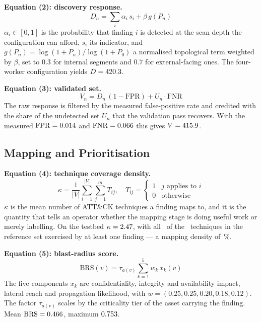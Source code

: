 \documentclass[journal]{IEEEtran}
\begin{document}
\textbf{Equation (2): discovery response.}
\begin{equation}
  D_n = \sum_{i} \alpha_i \, s_i + \beta \, g(P_n)
  \label{eq:discovery}
\end{equation}
$\alpha_i \in [0,1]$ is the probability that finding $i$ is detected at the
scan depth the configuration can afford, $s_i$ its indicator, and
$g(P_n)=\log(1+P_n)/\log(1+P_0)$ a normalised topological term weighted by
$\beta$, set to $0.3$ for internal segments and $0.7$ for external-facing
ones. The four-worker configuration yields $D=420.3$.

\textbf{Equation (3): validated set.}
\begin{equation}
  V_n = D_n\,(1-\mathrm{FPR}) + U_n \cdot \mathrm{FNR}
  \label{eq:validate}
\end{equation}
The raw response is filtered by the measured false-positive rate and credited
with the share of the undetected set $U_n$ that the validation pass recovers.
With the measured $\mathrm{FPR}=0.014$ and $\mathrm{FNR}=0.066$ this gives
$V=415.9$.

\subsection{Mapping and Prioritisation}

\textbf{Equation (4): technique coverage density.}
\begin{equation}
  \kappa = \frac{1}{|V|}\sum_{i=1}^{|V|}\sum_{j=1}^{m} T_{ij},
  \quad
  T_{ij}=\begin{cases} 1 & j \text{ applies to } i\\
                       0 & \text{otherwise}\end{cases}
  \label{eq:coverage}
\end{equation}
$\kappa$ is the mean number of ATT\&CK techniques a finding maps to, and it is
the quantity that tells an operator whether the mapping stage is doing useful
work or merely labelling. On the testbed $\kappa=2.47$, with all
\techCovered\ of the \techTotal\ techniques in the reference set exercised by
at least one finding --- a mapping density of \mapDensity\,\%.

\textbf{Equation (5): blast-radius score.}
\begin{equation}
  \mathrm{BRS}(v) = \tau_{a(v)} \sum_{k=1}^{5} w_k \, x_k(v)
  \label{eq:brs}
\end{equation}
The five components $x_k$ are confidentiality, integrity and availability
impact, lateral reach and propagation likelihood, with
$w=(0.25,0.25,0.20,0.18,0.12)$. The factor $\tau_{a(v)}$ scales by the
criticality tier of the asset carrying the finding. Mean
$\mathrm{BRS}=0.466$, maximum $0.753$.
\end{document}
